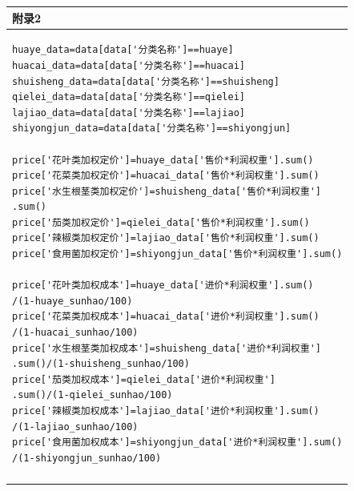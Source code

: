 \documentclass{my_paper}
\begin{document}
\begin{table}[H]
    \centering
    \begin{tabular}{|p{14.0cm}|}
    \hline
    \textbf{附录2} \\ 
    \hline
\begin{lstlisting}
huaye_data=data[data['分类名称']==huaye]
huacai_data=data[data['分类名称']==huacai]
shuisheng_data=data[data['分类名称']==shuisheng]
qielei_data=data[data['分类名称']==qielei]
lajiao_data=data[data['分类名称']==lajiao]
shiyongjun_data=data[data['分类名称']==shiyongjun]

price['花叶类加权定价']=huaye_data['售价*利润权重'].sum()
price['花菜类加权定价']=huacai_data['售价*利润权重'].sum()
price['水生根茎类加权定价']=shuisheng_data['售价*利润权重']
.sum()
price['茄类加权定价']=qielei_data['售价*利润权重'].sum()
price['辣椒类加权定价']=lajiao_data['售价*利润权重'].sum()
price['食用菌加权定价']=shiyongjun_data['售价*利润权重'].sum()

price['花叶类加权成本']=huaye_data['进价*利润权重'].sum()
/(1-huaye_sunhao/100)
price['花菜类加权成本']=huacai_data['进价*利润权重'].sum()
/(1-huacai_sunhao/100)
price['水生根茎类加权成本']=shuisheng_data['进价*利润权重']
.sum()/(1-shuisheng_sunhao/100)
price['茄类加权成本']=qielei_data['进价*利润权重']
.sum()/(1-qielei_sunhao/100)
price['辣椒类加权成本']=lajiao_data['进价*利润权重'].sum()
/(1-lajiao_sunhao/100)
price['食用菌加权成本']=shiyongjun_data['进价*利润权重'].sum()
/(1-shiyongjun_sunhao/100)
\end{lstlisting}
    \\
    \\
\hline
    \end{tabular}
\end{table}\newpage
\end{document}
